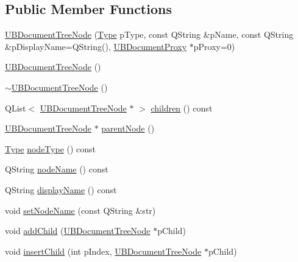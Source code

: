 \subsection*{Public Member Functions}
\begin{DoxyCompactItemize}
\item 
\hyperlink{class_u_b_document_tree_node_ae92ef846edde1538c194896cecb15df6}{U\-B\-Document\-Tree\-Node} (\hyperlink{class_u_b_document_tree_node_aba3711968b28d176491608c6c451823b}{Type} p\-Type, const Q\-String \&p\-Name, const Q\-String \&p\-Display\-Name=Q\-String(), \hyperlink{class_u_b_document_proxy}{U\-B\-Document\-Proxy} $\ast$p\-Proxy=0)
\item 
\hyperlink{class_u_b_document_tree_node_a284c9caa7e634a50c2d321b97658e5b6}{U\-B\-Document\-Tree\-Node} ()
\item 
\hyperlink{class_u_b_document_tree_node_a9b178af35ed485fc2bef893eb469483e}{$\sim$\-U\-B\-Document\-Tree\-Node} ()
\item 
Q\-List$<$ \hyperlink{class_u_b_document_tree_node}{U\-B\-Document\-Tree\-Node} $\ast$ $>$ \hyperlink{class_u_b_document_tree_node_add8f3447b6f6d02ff78a440386ed89f4}{children} () const 
\item 
\hyperlink{class_u_b_document_tree_node}{U\-B\-Document\-Tree\-Node} $\ast$ \hyperlink{class_u_b_document_tree_node_acebd29725bf84953e7f65edee7a7c7ab}{parent\-Node} ()
\item 
\hyperlink{class_u_b_document_tree_node_aba3711968b28d176491608c6c451823b}{Type} \hyperlink{class_u_b_document_tree_node_a20713ca76afd123a3969933729504bce}{node\-Type} () const 
\item 
Q\-String \hyperlink{class_u_b_document_tree_node_ab16ac37e87506a868a07eab28e2e572e}{node\-Name} () const 
\item 
Q\-String \hyperlink{class_u_b_document_tree_node_a7421eabcc9b106cca6a4b986920d161b}{display\-Name} () const 
\item 
void \hyperlink{class_u_b_document_tree_node_afd9356b58412d6df1852ba9676415799}{set\-Node\-Name} (const Q\-String \&str)
\item 
void \hyperlink{class_u_b_document_tree_node_a030231587a1edb3ceb30cc3774b1b8d4}{add\-Child} (\hyperlink{class_u_b_document_tree_node}{U\-B\-Document\-Tree\-Node} $\ast$p\-Child)
\item 
void \hyperlink{class_u_b_document_tree_node_ab931d6811df7e247108b3312f4e254c8}{insert\-Child} (int p\-Index, \hyperlink{class_u_b_document_tree_node}{U\-B\-Document\-Tree\-Node} $\ast$p\-Child)
\item 

\end{DoxyCompactItemize}
